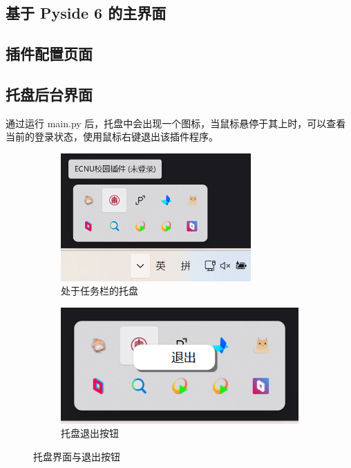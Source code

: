 \subsection{基于 Pyside 6 的主界面}

\subsection{插件配置页面}

\subsection{托盘后台界面}

通过运行 main.py 后，托盘中会出现一个图标，当鼠标悬停于其上时，可以查看当前的登录状态，使用鼠标右键退出该插件程序。

\begin{figure}[H]
    \centering
    \begin{subfigure}[b]{0.35\textwidth}
        \centering
        \includegraphics[width=0.8\textwidth]{img/tray_interface.png}
        \caption{处于任务栏的托盘}
        \label{fig:tray_interface}
    \end{subfigure}
    \hspace{0.06\textwidth}
    \begin{subfigure}[b]{0.3\textwidth}
        \centering
        \includegraphics[width=\textwidth]{img/tray_exit.png}
        \caption{托盘退出按钮}
        \label{fig:tray_exit}
    \end{subfigure}
    \caption{托盘界面与退出按钮}
    \label{fig:tray_combined}
\end{figure}

